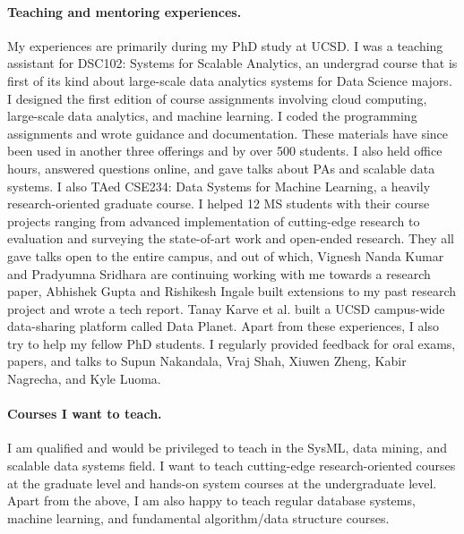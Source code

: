 \documentclass[letterpaper]{article}
\begin{document}
\paragraph{Teaching and mentoring experiences.} My experiences are primarily during my PhD study at UCSD. I was a teaching assistant for DSC102: Systems for Scalable Analytics, an undergrad course that is first of its kind about large-scale data analytics systems for Data Science majors. I designed the first edition of course assignments involving cloud computing, large-scale data analytics, and machine learning. I coded the programming assignments and wrote guidance and documentation. These materials have since been used in another three offerings and by over 500 students. I also held office hours, answered questions online, and gave talks about PAs and scalable data systems. I also TAed CSE234: Data Systems for Machine Learning, a heavily research-oriented graduate course. I helped 12 MS students with their course projects ranging from advanced implementation of cutting-edge research to evaluation and surveying the state-of-art work and open-ended research. They all gave talks open to the entire campus, and out of which, Vignesh Nanda Kumar and Pradyumna Sridhara are continuing working with me towards a research paper, Abhishek Gupta and Rishikesh Ingale built extensions to my past research project and wrote a tech report. Tanay Karve et al. built a UCSD campus-wide data-sharing platform called Data Planet. Apart from these experiences, I also try to help my fellow PhD students. I regularly provided feedback for oral exams, papers, and talks to Supun Nakandala, Vraj Shah, Xiuwen Zheng, Kabir Nagrecha, and Kyle Luoma.

\paragraph{Courses I want to teach.} I am qualified and would be privileged to teach in the SysML, data mining, and scalable data systems field. I want to teach cutting-edge research-oriented courses at the graduate level and hands-on system courses at the undergraduate level. Apart from the above, I am also happy to teach regular database systems, machine learning, and fundamental algorithm/data structure courses.



%
%
\end{document}
